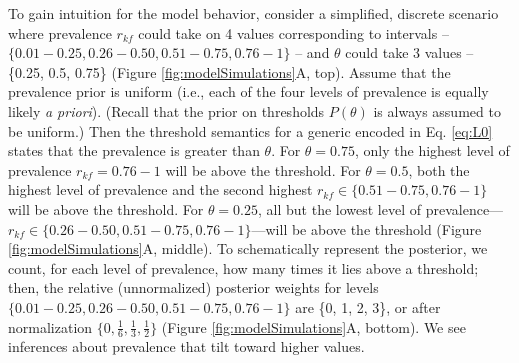 \documentclass[floatsintext,man]{apa6}
\newcommand{\denote}[1]{\mbox{ $[\![ #1 ]\!]$}}
\newcommand*\diff{\mathop{}\!\mathrm{d}}
\newcommand{\mht}[1]{{\textcolor{Blue}{[mht: #1]}}}
\begin{document}
To gain intuition for the model behavior, consider a simplified, discrete scenario where prevalence $r_{kf}$ could take on 4 values corresponding to intervals -- $\{0.01-0.25, 0.26 - 0.50, 0.51 - 0.75, 0.76 - 1\}$ -- and $\theta$ could take 3 values -- \{0.25, 0.5, 0.75\} (Figure \ref{fig:modelSimulations}A, top). Assume that the prevalence prior is uniform (i.e., each of the four levels of prevalence is equally likely \emph{a priori}). (Recall that the prior on thresholds $P(\theta)$ is always assumed to be uniform.)
Then the threshold semantics for a generic encoded in Eq. \ref{eq:L0} states that the prevalence is greater than $\theta$.
For $\theta = 0.75$, only the highest level of prevalence $r_{kf} = 0.76 - 1$ will be above the threshold.  
For $\theta = 0.5$, both the highest level of prevalence and the second highest $r_{kf} \in \{0.51 - 0.75, 0.76 - 1\}$ will be above the threshold.  
For $\theta = 0.25$, all but the lowest level of prevalence---$r_{kf} \in \{0.26 - 0.50, 0.51 - 0.75, 0.76 - 1\}$---will be above the threshold (Figure \ref{fig:modelSimulations}A, middle).  
To schematically represent the posterior, we count, for each level of prevalence, how many times it lies above a threshold; then, the relative (unnormalized) posterior weights for levels $\{0.01-0.25, 0.26 - 0.50, 0.51 - 0.75, 0.76 - 1 \}$ are \{0, 1, 2, 3\}, or after normalization  $\{0, \frac{1}{6}, \frac{1}{3}, \frac{1}{2}\}$ (Figure \ref{fig:modelSimulations}A, bottom).
We see inferences about prevalence that tilt toward higher values.





%
%
\end{document}
